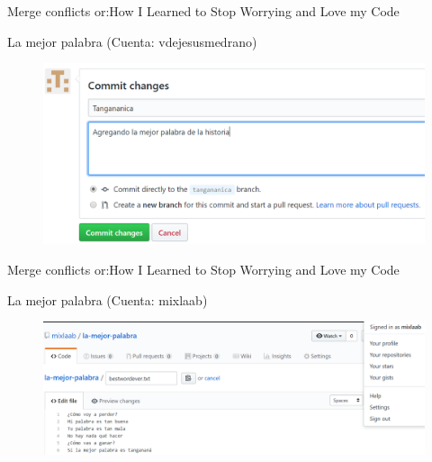 \documentclass[10pt]{beamer}
\begin{document}
\begin{frame}{Merge conflicts or:}{How I Learned to Stop Worrying and Love my Code \heartsuit}

\begin{block}{La mejor palabra (Cuenta: vdejesusmedrano)}

\begin{figure}[h!]
\centering
\includegraphics [scale=0.3]{tangananica2}
\label{fig:issues}
\end{figure}
    
\end{block}

\end{frame}

\begin{frame}{Merge conflicts or:}{How I Learned to Stop Worrying and Love my Code \heartsuit}

\begin{block}{La mejor palabra (Cuenta: mixlaab)}

\begin{figure}[h!]
\centering
\includegraphics [scale=0.25]{tanganana}
\label{fig:issues}
\end{figure}
    
\end{block}

\end{frame}
\end{document}
